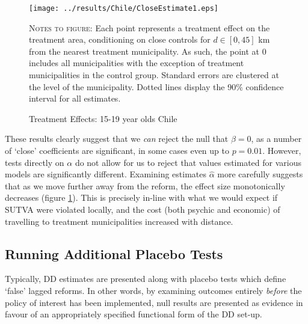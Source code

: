 \documentclass{article}
\begin{document}
\begin{spacing}{1.3}
\begin{figure}[h!]
\texttt{[image: ../results/Chile/CloseEstimate1.eps]}
\caption{Treatment Effects: 15-19 year olds Chile}
\label{Sfig:ChileAlpha}
\vspace{2mm}
\begin{footnotesize}
\textsc{Notes to figure}: Each point represents a treatment effect on the treatment
area, conditioning on close controls for $d\in [0,45]$ km from the nearest treatment 
municipality.  As such, the point at 0 includes all municipalities with the exception
of treatment municipalities in the control group.  Standard errors are clustered at 
the level of the municipality.  Dotted lines display the 90\% confidence interval for 
all estimates.
\end{footnotesize}
\end{figure}

These results clearly suggest that we \emph{can} reject the null that $\beta=0$, as
a number of `close' coefficients are significant, in some cases even up to $p=0.01$.
However, tests directly on $\alpha$ do not allow for us to reject that values 
estimated for various models are significantly different.  Examining estimates 
$\hat\alpha$ more carefully suggests that as we move further away from the reform,
the effect size monotonically decreases (figure \ref{Sfig:ChileAlpha}).  This is
precisely in-line with what we would expect if SUTVA were violated locally, and
the cost (both psychic and economic) of travelling to treatment municipalities
increased with distance.

\subsection{Running Additional Placebo Tests}
Typically, DD estimates are presented along with placebo tests which define `false'
lagged reforms.  In other words, by examining outcomes entirely \emph{before} the
policy of interest has been implemented, null results are presented as evidence
in favour of an appropriately specified functional form of the DD set-up.


\end{spacing}
\end{document}
